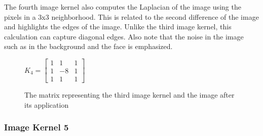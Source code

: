 \documentclass[12pt,letterpaper]{article}
\begin{document}
The fourth image kernel also computes the Laplacian of the image using the pixels in a 3x3 neighborhood. This is related to the second difference of the image and highlights the edges of the image. Unlike the third image kernel, this calculation can capture diagonal edges. Also note that the noise in the image such as in the background and the face is emphasized.
\begin{figure}[ht]
\centering
$K_4 =  \begin{bmatrix}
1 & 1 & 1\\
1 & -8 & 1\\
1 & 1 & 1
\end{bmatrix}$
\hspace{2cm} 
\caption{\small{The matrix representing the third image kernel and the image after its application}
\label{fig:ker4} }
\end{figure}

\subsubsection{Image Kernel 5}
\end{document}
